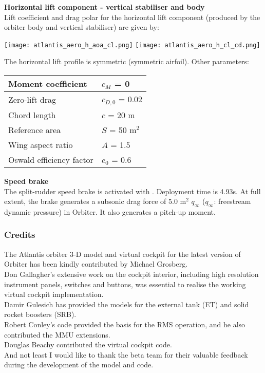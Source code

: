 \documentclass[Orbiter User Manual.tex]{subfiles}
\begin{document}
\textbf{\large Horizontal lift component - vertical stabiliser and body}\\

Lift coefficient and drag polar for the horizontal lift component (produced by the orbiter body and vertical stabiliser) are given by:

\texttt{[image: atlantis\_aero\_h\_aoa\_cl.png]}
\texttt{[image: atlantis\_aero\_h\_cl\_cd.png]}

The horizontal lift profile is symmetric (symmetric airfoil). Other parameters:

\begin{table}[H]
\centering
\begin{tabular}{|l|l|}
\hline
Moment coefficient & $c_M$ = 0 \\ \hline
Zero-lift drag & $c_{D,0}$ = 0.02 \\ \hline
Chord length & $c$ = 20 m \\ \hline
Reference area & $S$ = 50 m$^2$ \\ \hline
Wing aspect ratio & $A$ = 1.5 \\ \hline
Oswald efficiency factor & $e_0$ = 0.6 \\ \hline
\end{tabular}
\end{table}

\textbf{\large Speed brake}\\

The split-rudder speed brake is activated with . Deployment time is 4.93s. At full extent, the brake generates a subsonic drag force of 5.0 m$^{2}$ $q_\infty$ ($q_\infty$: freestream dynamic pressure) in Orbiter. It also generates a pitch-up moment.

\subsubsection{Credits}
The Atlantis orbiter 3-D model and virtual cockpit for the latest version of Orbiter has been kindly contributed by Michael Grosberg.\\

Don Gallagher's extensive work on the cockpit interior, including high resolution instrument panels, switches and buttons, was essential to realise the working virtual cockpit implementation.\\

Damir Gulesich has provided the models for the external tank (ET) and solid rocket boosters (SRB).\\

Robert Conley's code provided the basis for the RMS operation, and he also contributed the MMU extensions.\\

Douglas Beachy contributed the virtual cockpit code.\\

And not least I would like to thank the beta team for their valuable feedback during the development of the model and code.
\end{document}
